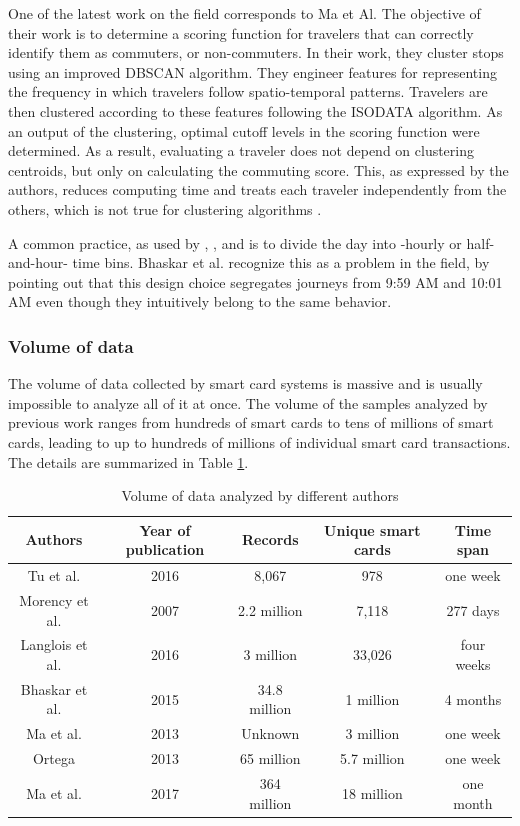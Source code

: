 \documentclass{article}
\begin{document}
One of the latest work on the field corresponds to Ma et Al. The objective of their work is to determine a scoring function for travelers that can correctly identify them as commuters, or non-commuters. In their work, they cluster stops using an improved DBSCAN algorithm. They engineer features for representing the frequency in which travelers follow spatio-temporal patterns. Travelers are then clustered according to these features following the ISODATA algorithm. As an output of the clustering, optimal cutoff levels in the scoring function were determined. As a result, evaluating a traveler does not depend on clustering centroids, but only on calculating the commuting score. This, as expressed by the authors, reduces computing time and treats each traveler independently from the others, which is not true for clustering algorithms \cite{ma2017understanding}.

A common practice, as used by \cite{ma2017understanding}, \cite{langlois2016inferring}, and \cite{morency2007measuring} is to divide the day into -hourly or half-and-hour- time bins. Bhaskar et al. recognize this as a problem in the field, by pointing out that this design choice segregates journeys from 9:59 AM and 10:01 AM even though they intuitively belong to the same behavior. 

\subsubsection{Volume of data}
The volume of data collected by smart card systems is massive and is usually impossible to analyze all of it at once. The volume of the samples analyzed by previous work ranges from hundreds of smart cards to tens of millions of smart cards, leading to up to hundreds of millions of individual smart card transactions. The details are summarized in Table \ref{table:volumeData}.
 
\begin{table}[H]
\centering
\begin{tabular}{||c c c c c||} 
 \hline
 Authors & Year of publication & Records & Unique smart cards & Time span \\ [0.5ex] 
 \hline\hline
 Tu et al. \cite{tu2016impact} & 2016 & 8,067 & 978 & one week \\ 
 Morency et al. \cite{morency2007measuring} & 2007 & 2.2 million & 7,118 & 277 days \\
 Langlois et al. \cite{langlois2016inferring} & 2016 & 3 million & 33,026 & four weeks \\
 Bhaskar et al. \cite{bhaskar2015passenger} & 2015 & 34.8 million & 1 million & 4 months \\ %
 Ma et al. \cite{ma2013mining} & 2013 & Unknown & 3 million & one week \\
 Ortega \cite{ortega2013classification} & 2013 & 65 million & 5.7 million & one week \\
 Ma et al. \cite{ma2017understanding} & 2017 & 364 million & 18 million & one month\\ [1ex] 
 \hline
\end{tabular}
\caption{Volume of data analyzed by different authors}
\label{table:volumeData}
\end{table}
\end{document}
